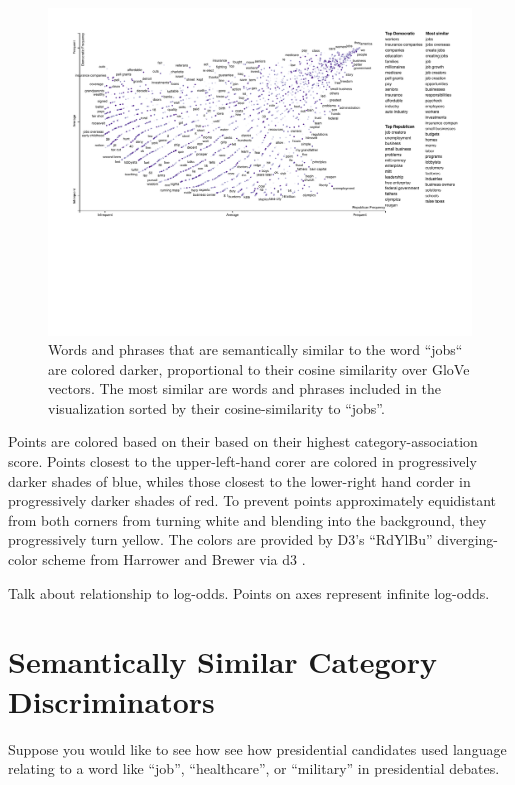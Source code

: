 \documentclass[11pt]{article}
\begin{document}
\begin{figure}[h!!]
  \includegraphics[width=\linewidth]{similarity_scattertext}
  \caption{Words and phrases that are semantically similar to the word ``jobs`` are colored darker, proportional to their cosine similarity over GloVe vectors. The most similar are words and phrases included in the visualization sorted by their cosine-similarity to ``jobs''.}
  \label{scattertextembeddings}
\end{figure}

Points are colored based on their based on their highest category-association score.  Points closest to the upper-left-hand corer are colored in progressively darker shades of blue, whiles those closest to the lower-right hand corder in progressively darker shades of red.  To prevent points approximately equidistant from both corners from turning white and blending into the background, they progressively turn yellow.  The colors are provided by D3's ``RdYlBu'' diverging-color scheme from Harrower and Brewer \cite{colorbrewer} via d3 \cite{d3}.

Talk about relationship to log-odds.  Points on axes represent infinite log-odds. 

\section{Semantically Similar Category Discriminators}
\label{embeddings}

Suppose you would like to see how see how presidential candidates used language relating to a word like ``job'', ``healthcare'', or ``military'' in presidential debates.  
\end{document}
